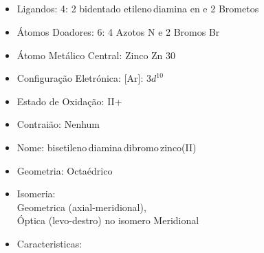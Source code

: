 \documentclass[12pt]{article}
\begin{document}
	\subsection{\ch{[Zn(en)2Br2]}}
	\begin{itemize}
   
   
   \item Ligandos: 4: 
   	2 bidentado etileno\,diamina en e
		2 Brometos 
   
   
   \item Átomos Doadores: 6:
   	4 Azotos N e
		2 Bromos Br
   
   \item Átomo Metálico Central: Zinco Zn 30
   
   \item Configuração Eletrónica: [Ar]: $ 3d^{10} $
		   
   \item Estado de Oxidação: II+
   
   \item Contraião: Nenhum
   
   \item Nome: bisetileno\,diamina\,dibromo\,zinco(II)
   
   \item Geometria: Octaédrico
   
   \item Isomeria:\\
   	Geometrica (axial-meridional),\\
		Óptica (levo-destro) no isomero Meridional
		
	\item Caracteristicas:

	\end{itemize}
	
\break


	
\end{document}
